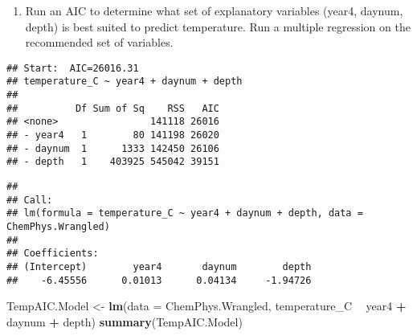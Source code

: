 \documentclass[]{article}
\newenvironment{Shaded}{\begin{snugshade}}{\end{snugshade}}
\newcommand{\CommentTok}[1]{\textcolor[rgb]{0.56,0.35,0.01}{\textit{#1}}}
\newcommand{\DataTypeTok}[1]{\textcolor[rgb]{0.13,0.29,0.53}{#1}}
\newcommand{\DecValTok}[1]{\textcolor[rgb]{0.00,0.00,0.81}{#1}}
\newcommand{\KeywordTok}[1]{\textcolor[rgb]{0.13,0.29,0.53}{\textbf{#1}}}
\newcommand{\NormalTok}[1]{#1}
\newcommand{\OperatorTok}[1]{\textcolor[rgb]{0.81,0.36,0.00}{\textbf{#1}}}
\newcommand{\StringTok}[1]{\textcolor[rgb]{0.31,0.60,0.02}{#1}}
\providecommand{\tightlist}{%
  \setlength{\itemsep}{0pt}\setlength{\parskip}{0pt}}
\begin{document}
\begin{enumerate}
\def\labelenumi{\arabic{enumi}.}
\setcounter{enumi}{3}
\tightlist
\item
  Run an AIC to determine what set of explanatory variables (year4,
  daynum, depth) is best suited to predict temperature. Run a multiple
  regression on the recommended set of variables.
\end{enumerate}

\begin{Shaded}
\end{Shaded}

\begin{verbatim}
## Start:  AIC=26016.31
## temperature_C ~ year4 + daynum + depth
## 
##          Df Sum of Sq    RSS   AIC
## <none>                141118 26016
## - year4   1        80 141198 26020
## - daynum  1      1333 142450 26106
## - depth   1    403925 545042 39151
\end{verbatim}

\begin{verbatim}
## 
## Call:
## lm(formula = temperature_C ~ year4 + daynum + depth, data = ChemPhys.Wrangled)
## 
## Coefficients:
## (Intercept)        year4       daynum        depth  
##    -6.45556      0.01013      0.04134     -1.94726
\end{verbatim}

\begin{Shaded}
\begin{Highlighting}[]
\NormalTok{TempAIC.Model <-}\StringTok{ }\KeywordTok{lm}\NormalTok{(}\DataTypeTok{data =}\NormalTok{ ChemPhys.Wrangled, temperature_C }\OperatorTok{~}\StringTok{ }\NormalTok{year4 }\OperatorTok{+}\StringTok{ }\NormalTok{daynum }\OperatorTok{+}\StringTok{ }\NormalTok{depth)}
\KeywordTok{summary}\NormalTok{(TempAIC.Model)}
\end{Highlighting}
\end{Shaded}
\end{document}
